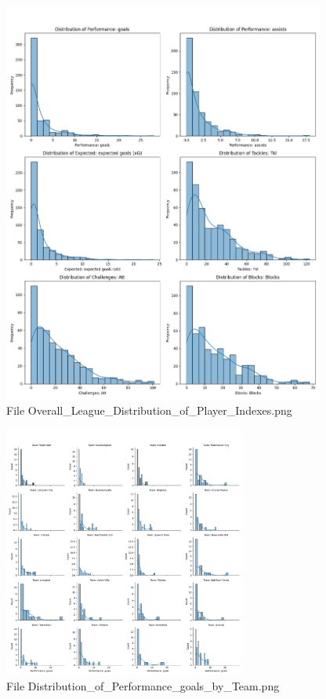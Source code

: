 \documentclass[12pt]{report}
\begin{document}
{{\begin{figure}[h]
    \includegraphics[width=400px]{Overall_League_Distribution_of_Player_Indexes.png}
    \caption{File Overall\_League\_Distribution\_of\_Player\_Indexes.png} %
    \label{fig:p1}
\end{figure}
\begin{figure}[h]
    \centering
    \includegraphics[width=300px]{Distribution_of_Performance_goals_by_Team.png}
    \caption{File Distribution\_of\_Performance\_goals\_by\_Team.png} %
    \label{fig:p2}
\end{figure}
\begin{figure}[h]

\end{figure}}}
\end{document}
